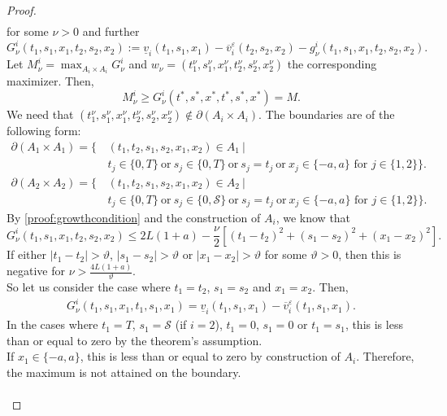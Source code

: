 \documentclass[a4paper]{scrartcl}
\theoremstyle{remark}
\theoremstyle{definition}
\numberwithin{equation}{section}
\begin{document}
\begin{proof}
\begin{align*}
    \end{align*}
    for some $\nu>0$ and further
    \begin{equation*}
        G_\nu ^i (t_1,s_1,x_1,t_2,s_2,x_2) := \underline{v}_i(t_1,s_1,x_1)-\overline{v}^\varepsilon_i(t_2,s_2,x_2)- g_\nu^i(t_1,s_1,x_1,t_2,s_2,x_2).
    \end{equation*}
    Let $M_\nu ^i=\max_{A_i \times A_i} G_\nu^i$ and $w_\nu=(t_1^\nu,s_1^\nu,x_1^\nu,t_2^\nu,s_2^\nu,x_2^\nu)$ the corresponding maximizer. Then,
    \begin{equation*}
        M_\nu ^i \geq G_\nu^i(t^*,s^*,x^*,t^*,s^*,x^*)=M.
    \end{equation*}
    We need that $(t_1^\nu,s_1^\nu,x_1^\nu,t_2^\nu,s_2^\nu,x_2^\nu) \notin \partial (A_i \times A_i)$. %
    The boundaries are of the following form: 
   \begin{align*}
\partial (A_1 \times A_1) =  \big\{\, &(t_1, t_2, s_1, s_2, x_1, x_2) \in A_1 \ \big| \\
& t_j \in \{0,T\} \ \text{or} \ s_j \in \{0,T\} \ \text{or} \ s_j = t_j \ \text{or} \ x_j \in \{-a,a\} \text{ for } j \in \{1,2\}\big\}.
\end{align*}
\begin{align*}
\partial (A_2 \times A_2) =  \big\{\, &(t_1, t_2, s_1, s_2, x_1, x_2) \in A_2 \ \big| \\
& t_j \in \{0,T\} \ \text{or} \ s_j \in \{0,\mathcal{S}\} \ \text{or} \ s_j = t_j \ \text{or} \ x_j \in \{-a,a\} \text{ for } j \in \{1,2\}\big\}.
\end{align*}
    By \eqref{proof:growthcondition} and the construction of $A_i$, we know that
    \begin{equation*}
         G_\nu ^i (t_1,s_1,x_1,t_2,s_2,x_2) \leq 2L (1+a)- \frac{\nu}{2}\left[(t_1-t_2)^2+(s_1-s_2)^2+(x_1-x_2)^2\right].
    \end{equation*}
    If either $|t_1-t_2|>\vartheta$, $|s_1-s_2|>\vartheta$ or $|x_1-x_2|>\vartheta$ for some $\vartheta>0$, then this is negative for $\nu > \frac{4L(1+a)}{\vartheta}$. \\So let us consider the case where $t_1=t_2$, $s_1=s_2$ and $x_1=x_2$.
    Then,
    \begin{align*}
             G_\nu ^i (t_1,s_1,x_1,t_1,s_1,x_1) =  \underline{v}_i(t_1,s_1,x_1)-\overline{v}^\varepsilon_i(t_1,s_1,x_1).
    \end{align*}
    In the cases where $t_1=T$,  $s_1=\mathcal{S}$ (if $i=2$), $t_1=0$, $s_1=0$ or $t_1=s_1$, this is less than or equal to zero by the theorem's assumption. \\If $x_1 \in \{-a,a\}$, this is less than or equal to zero by construction of $A_i$. Therefore, the maximum is not attained on the boundary. \\ \ \\

\end{proof}
\end{document}
